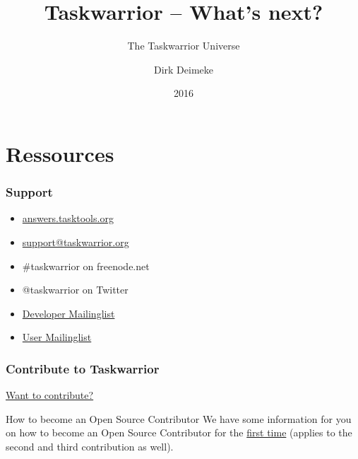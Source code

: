 \documentclass[t,handout]{beamer}
\title{Taskwarrior -- What's next?}
\subtitle{The Taskwarrior Universe}
\author[Deimeke, Dirk]{Dirk Deimeke}
\institute[Taskwarrior Academy]{Taskwarrior Academy}
\date{2016}
\begin{document}
\begin{frame} %
	\titlepage
\end{frame}



\section{Ressources}

\begin{frame}\frametitle{Support}
    \begin{itemize}
        \item \href{https://answers.tasktools.org/}{answers.tasktools.org}
        \item \href{mailto:support@taskwarrior.org}{support@taskwarrior.org}
        \item \#taskwarrior on freenode.net
        \item @taskwarrior on Twitter
        \item \href{https://groups.google.com/forum/\#!forum/taskwarrior-dev}{Developer Mailinglist}
        \item \href{https://groups.google.com/forum/\#!forum/taskwarrior-user}{User Mailinglist}
    \end{itemize}
\end{frame}

\begin{frame}\frametitle{Contribute to Taskwarrior}
    \vfill
    \href{http://taskwarrior.org/docs/contribute.html}{Want to contribute?}
    \vfill
	\begin{alertblock}{How to become an Open Source Contributor}
		We have some information for you on how to become an Open Source Contributor for the \href{http://taskwarrior.org/docs/first_time.html}{first time} (applies to the second and third contribution as well).
	\end{alertblock}
\end{frame}
\end{document}
